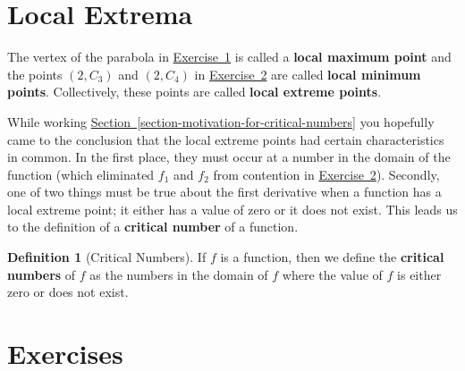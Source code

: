 \documentclass[12pt,]{book}
\newcommand{\terminology}[1]{\textbf{#1}}
\theoremstyle{plain}
\theoremstyle{definition}
\newtheorem{definition}[theorem]{Definition}
\numberwithin{equation}{section}
\newcommand{\point}[2]{\left(#1,#2\right)}
\begin{document}
\section[Local Extrema]{Local Extrema}\label{section-local-extrema}
The vertex of the parabola in \hyperref[exercise-parabola-vertex]{Exercise~1} is called a \terminology{local maximum point} and the points \(\point{2}{C_3}\) and \(\point{2}{C_4}\) in \hyperref[exercise-distinguish-graphs-by-critical-nature]{Exercise~2} are called \terminology{local minimum points}.  Collectively, these points are called \terminology{local extreme points}.%
\par
While working \hyperref[section-motivation-for-critical-numbers]{Section~\ref*{section-motivation-for-critical-numbers}} you hopefully came to the conclusion that the local extreme points had certain characteristics in common.  In the first place, they must occur at a number in the domain of the function (which eliminated \(f_1\) and \(f_2\) from contention in \hyperref[exercise-distinguish-graphs-by-critical-nature]{Exercise~2}).  Secondly, one of two things must be true about the first derivative when a function has a local extreme point; it either has a value of zero or it does not exist.  This leads us to the definition of a \terminology{critical number} of a function.%
\begin{definition}[Critical Numbers]\label{definition-critical-numbers}
If \(f\) is a function, then we define the \terminology{critical numbers} of \(f\) as the numbers in the domain of \(f\) where the value of \(f\) is either zero or does not exist.%
\end{definition}
\typeout{************************************************}
\typeout{************************************************}
\section*{Exercises}\label{exercises-47}
\end{document}

